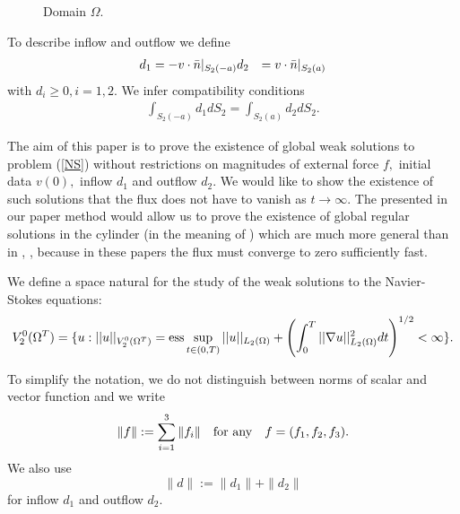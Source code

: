 \documentclass{amsart}
\theoremstyle{plain}
\begin{document}
\begin{figure}[hbt]
\begin{center}
\end{center}
\caption{Domain $\Omega.$}\label{om1}
\end{figure}

To describe inflow and outflow we define \begin{eqnarray} \label{d} \begin{aligned} d_1 &
=  -v\cdot \bar{n}|_{S_2(-a)} {\hfil\break} d_2 & =  v \cdot
\bar{n}|_{S_2(a)} \end{aligned} \end{eqnarray} with $d_i \ge 0, i=1,2.$ We infer
compatibility conditions \begin{eqnarray} \label{d} \int_{S_2(-a)} d_1dS_2 =
\int_{S_2(a)} d_2 dS_2. \end{eqnarray}

The aim of this paper is to prove the existence of global weak
solutions to problem (\ref{NS}) without restrictions on magnitudes
of external force $f,$ initial data $v(0),$ inflow $d_1$ and
outflow $d_2.$ We would like to show the existence of such
solutions that the flux does not have to vanish as $t {\rightarrow} \infty.$
The presented in our paper method
would allow us to prove the existence of global regular solutions
in the cylinder (in the meaning of \cite{RZ3}) which are much more
general than in \cite{K1}, \cite{K2}, \cite{Z} because in these
papers the flux must converge to zero sufficiently fast.

We define a space natural for the study of the weak solutions to the Navier-Stokes equations: \begin{eqnarray*} V_2^0({\Omega}^T) = \{u: ||u||_{V^0_2({\Omega}^T)} = {\rm ess}
\sup_{t\in(0,T)}||u||_{L_2({\Omega})} + \left(\int_0^T ||{\nabla}
u||_{L_2({\Omega})}^2 dt \right)^{1/2} <\infty \}. \end{eqnarray*}

To simplify the notation, we do not distinguish between norms of scalar and vector function and we write $$\|f\|:=\sum_{i=1}^3 \|f_i\|\quad  {\rm for \ any} \quad f=(f_1, f_2, f_3).$$ We also use $$\|d\| :=\|d_1\| + \|d_2\|$$ for inflow $d_1$ and outflow $d_2.$
\end{document}
